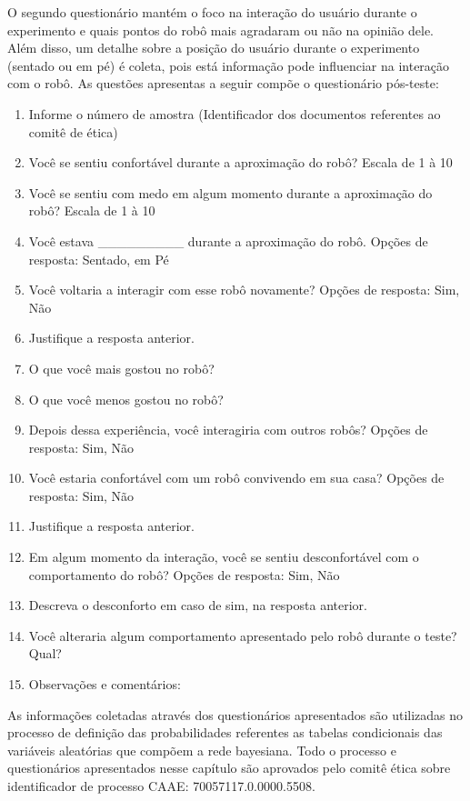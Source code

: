 O segundo questionário mantém o foco na interação do usuário durante o experimento e quais pontos do robô mais agradaram ou não na opinião dele. Além disso, um detalhe sobre a posição do usuário durante o experimento (sentado ou em pé) é coleta, pois está informação pode influenciar na interação com o robô. As questões apresentas a seguir compõe o questionário pós-teste:

\begin{enumerate}
	\item Informe o número de amostra (Identificador dos documentos referentes ao comitê de ética)
	\item Você se sentiu confortável durante a aproximação do robô? Escala de 1 à 10
	\item Você se sentiu com medo em algum momento durante a aproximação do robô? Escala de 1 à 10
	\item Você estava \_\_\_\_\_\_\_\_\_ durante a aproximação do robô. Opções de resposta: Sentado, em Pé
	\item Você voltaria a interagir com esse robô novamente? Opções de resposta: Sim, Não
	\item Justifique a resposta anterior.
	\item O que você mais gostou no robô?
	\item O que você menos gostou no robô?
	\item Depois dessa experiência, você interagiria com outros robôs? Opções de resposta: Sim, Não
	\item Você estaria confortável com um robô convivendo em sua casa? Opções de resposta: Sim, Não
	\item Justifique a resposta anterior.
	\item Em algum momento da interação, você se sentiu desconfortável com o comportamento do robô? Opções de resposta: Sim, Não
	\item Descreva o desconforto em caso de sim, na resposta anterior.
	\item Você alteraria algum comportamento apresentado pelo robô durante o teste? Qual?
	\item Observações e comentários:
\end{enumerate}

As informações coletadas através dos questionários apresentados são utilizadas no processo de definição das probabilidades referentes as tabelas condicionais das variáveis aleatórias que compõem a rede bayesiana. Todo o processo e questionários apresentados nesse capítulo são aprovados pelo comitê ética sobre identificador de processo CAAE: 70057117.0.0000.5508.

